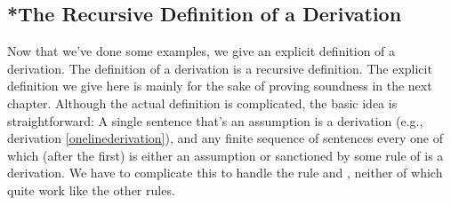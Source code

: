 \subsection{*The Recursive Definition of a Derivation}\label{RecDefOfDerv}
Now that we've done some examples, we give an explicit definition of a derivation. 
The definition of a derivation is a recursive definition. 
The explicit definition we give here is mainly for the sake of proving soundness in the next chapter. 
Although the actual definition is complicated, the basic idea is straightforward: 
A single \GSL{} sentence that's an assumption is a derivation (e.g., derivation \ref{onelinederivation}), and any finite sequence of \GSL{} sentences every one of which (after the first) is either an assumption or sanctioned by some rule of \GSD{} is a derivation. 
We have to complicate this to handle the rule  and , neither of which quite work like the other rules.%
